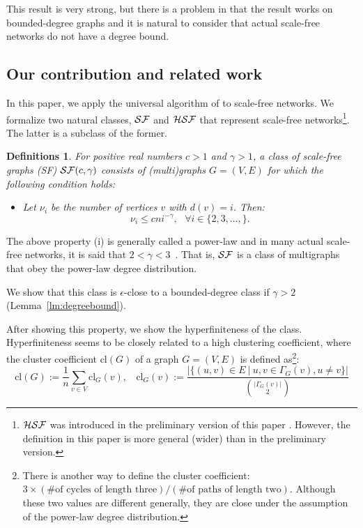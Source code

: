 \documentclass[11pt]{article}
\newtheorem{df}[thm]{Definitions}
\begin{document}
This result is very strong, but there is a problem in that the result works on bounded-degree graphs and it is natural to consider that actual scale-free networks do not have a degree bound.  



\subsection{Our contribution and related work}

In this paper, we apply the universal algorithm of \cite{NS_Testable_SJCOMP13} to scale-free networks. 
We formalize two natural classes, 
${\cal SF}$ and ${\cal HSF}$
that represent scale-free networks\footnote{
${\cal HSF}$ was introduced in the preliminary version of this paper \cite{ScalefreeTest_itohiro15_arXiv}. 
However, the definition in this paper is more general (wider) than in the preliminary version. 
}. 
The latter is a subclass of the former. 






\begin{df}\label{df:DSF}
For positive real numbers $c >1$ and $\gamma >1$, 
a class of {\em scale-free graphs (SF)} 
${\cal SF}(c,\gamma)$
consists of (multi)graphs $G=(V,E)$ for which the following condition holds: 
\begin{itemize}
\item[(i)] Let $\nu_i$ be the number of vertices $v$ with $d(v) = i$. Then: 
\begin{equation}
\nu_i \leq  c n i^{- \gamma}, 
~~~ \forall i \in \{ 2, 3, \ldots, \}. \label{eq:DSF}
\end{equation}
\end{itemize}
\end{df}



The above property (i) is generally called a power-law and in many actual scale-free networks, it is said that $2 < \gamma < 3$~\cite{AlbertBarabasi_SF_02}. 
That is, ${\cal SF}$ is a class of multigraphs that obey the power-law degree distribution. 



We show that this class is $\epsilon$-close to a bounded-degree class if $\gamma >2$ (Lemma~\ref{lm:degreebound}). 

After showing this property, we show the hyperfiniteness of the class. 
Hyperfiniteness seems to be closely related to a high clustering coefficient, where 
the cluster coefficient $\mbox{cl}(G)$ of a graph $G =(V,E)$ 
is defined as\footnote{
There is another way to define the cluster coefficient: 
$3 \times (\mbox{\# of cycles of length three}) / (\mbox{\# of paths of length two})$. 
Although these two values are different generally, they are close under the assumption of the power-law degree distribution.  
}:
$$
\mbox{cl}(G) := \frac{1}{n} \sum_{v \in V} \mbox{cl}_G(v),  
~~~~ \mbox{cl}_G(v) := \frac{|\{ (u,v) \in E ~|~ u,v \in \Gamma_G (v), u \neq v \}|}{{|\Gamma_G (v)| \choose 2}}
$$
\end{document}
